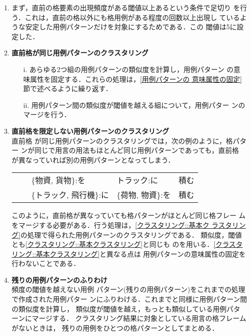 \begin{enumerate}
 \item まず，直前の格要素の出現頻度がある閾値以上あるという条件で足切り
       を行う．これは，直前の格以外にも格用例がある程度の回数以上出現し
       ているような安定した用例パターンだけを対象にするためである．この
       閾値は5に設定した．\label{クラスタリング::頻度の足切り}
 \item {\bf 直前格が同じ用例パターンのクラスタリング} \label{クラスタリング::基本クラスタリング}
       \begin{enumerate}
	\item[i.] あらゆる2つ組の用例パターンの類似度を計算し，用例パターン
	      の意味属性を固定する．これらの処理は，\ref{用例パターンの
	      意味属性の固定}節で述べるように繰り返す．
	\item[ii.] 用例パターン間の類似度が閾値を越える組について，用例パター
	      ンのマージを行う．
       \end{enumerate}
 \item {\bf 直前格を限定しない用例パターンのクラスタリング} \\ 直前格
       が同じ用例パターンのクラスタリングでは，次の例のように，格パター
       ンが同じで用言の用法もほとんど同じ用例パターンであっても，直前格
       が異なっていれば別の用例パターンとなってしまう．

       \vspace*{1ex}

       \begin{tabular}{l@{ }l@{\ \ }l@{ }l@{ }l}
	\ex & \subex & \{物資, 貨物\}:を & トラック:に & 積む \\
	    & \subex & \{トラック, 飛行機\}:に & \{荷物, 物資\}:を & 積む
       \end{tabular}

       \vspace*{1ex}

       \noindent
       このように，直前格が異なっていても格パターンがほとんど同じ格フレー
       ムをマージする必要がある．行う処理は，\ref{クラスタリング::基本ク
       ラスタリング}の処理で得られた用例パターンのクラスタリングである．
       類似度，閾値とも\ref{クラスタリング::基本クラスタリング}と同じも
       のを用いる．\ref{クラスタリング::基本クラスタリング}と異なる点は
       用例パターンの意味属性の固定を行わないことである．
 \item {\bf 残りの用例パターンのふりわけ} \\ 頻度の閾値を越えない用例
       パターン(残りの用例パターン)をこれまでの処理で作成された用例パター
       ンにふりわける．これまでと同様に用例パターン間の類似度を計算し，
       類似度が閾値を越え，もっとも類似している用例パターンにマージする．
       クラスタリング結果に対象としている用言の格フレームがないときは，
       残りの用例をひとつの格パターンとしてまとめる．
\end{enumerate}

